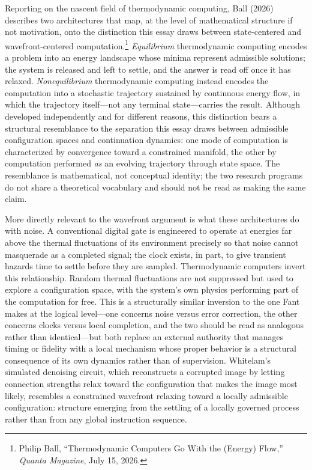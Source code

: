 \documentclass[12pt, a4paper]{article}
\begin{document}
Reporting on the nascent field of thermodynamic computing, Ball
(2026) describes two architectures that map, at the level of
mathematical structure if not motivation, onto the distinction
this essay draws between state-centered and wavefront-centered
computation.\footnote{Philip Ball, ``Thermodynamic Computers Go
With the (Energy) Flow,'' \textit{Quanta Magazine}, July 15,
2026.} \emph{Equilibrium} thermodynamic computing encodes a
problem into an energy landscape whose minima represent
admissible solutions; the system is released and left to settle,
and the answer is read off once it has relaxed. \emph{Nonequilibrium}
thermodynamic computing instead encodes the computation into a
stochastic trajectory sustained by continuous energy flow, in
which the trajectory itself---not any terminal state---carries
the result. Although developed independently and for different
reasons, this distinction bears a structural resemblance to the
separation this essay draws between admissible configuration
spaces and continuation dynamics: one mode of computation is
characterized by convergence toward a constrained manifold, the
other by computation performed \emph{as} an evolving trajectory
through state space. The resemblance is mathematical, not
conceptual identity; the two research programs do not share a
theoretical vocabulary and should not be read as making the same
claim.

More directly relevant to the wavefront argument is what these
architectures do with noise. A conventional digital gate is
engineered to operate at energies far above the thermal
fluctuations of its environment precisely so that noise cannot
masquerade as a completed signal; the clock exists, in part, to
give transient hazards time to settle before they are sampled.
Thermodynamic computers invert this relationship. Random thermal
fluctuations are not suppressed but used to explore a
configuration space, with the system's own physics performing
part of the computation for free. This is a structurally similar
inversion to the one Fant makes at the logical level---one
concerns noise versus error correction, the other concerns
clocks versus local completion, and the two should be read as
analogous rather than identical---but both replace an external
authority that manages timing or fidelity with a local mechanism
whose proper behavior is a structural consequence of its own
dynamics rather than of supervision. Whitelam's simulated
denoising circuit, which reconstructs a corrupted image by
letting connection strengths relax toward the configuration that
makes the image most likely, resembles a constrained wavefront
relaxing toward a locally admissible configuration: structure
emerging from the settling of a locally governed process rather
than from any global instruction sequence.
\end{document}
